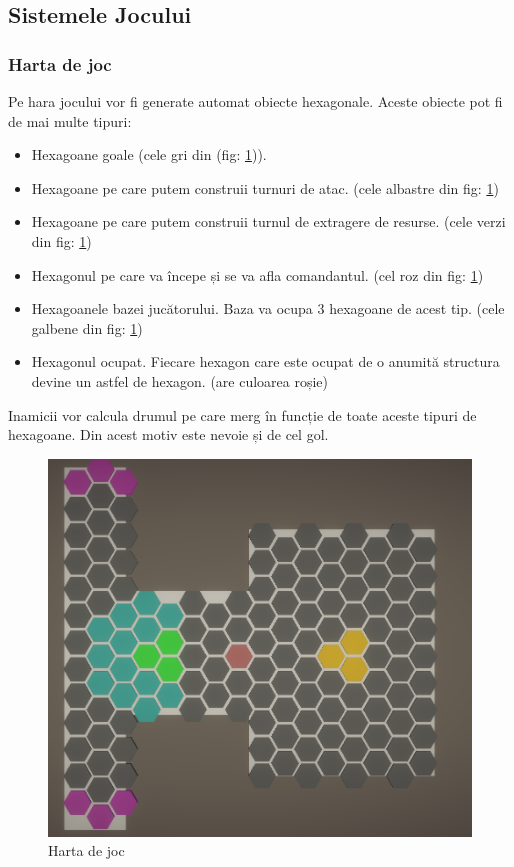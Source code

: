 \documentclass[12pt, a4paper]{article}
\begin{document}
	
	
	
	
	\subsection{Sistemele Jocului}
	
	\subsubsection{Harta de joc}
	
	Pe hara jocului vor fi generate automat obiecte hexagonale. Aceste obiecte pot fi de mai multe tipuri:
	\begin{itemize}
		\item Hexagoane goale (cele gri din (fig: \ref{fig: gridSystem})).
		\item Hexagoane pe care putem construii turnuri de atac. (cele albastre din fig: \ref{fig: gridSystem})
		\item Hexagoane pe care putem construii turnul de extragere de resurse. (cele verzi din fig: \ref{fig: gridSystem})
		\item Hexagonul pe care va începe și se va afla comandantul. (cel roz din fig: \ref{fig: gridSystem})
		\item Hexagoanele bazei jucătorului. Baza va ocupa 3 hexagoane de acest tip. (cele galbene din fig: \ref{fig: gridSystem})
		\item Hexagonul ocupat. Fiecare hexagon care este ocupat de o anumită structura devine un astfel de hexagon. (are culoarea roșie)
	\end{itemize}
	
	Inamicii vor calcula drumul pe care merg în funcție de toate aceste tipuri de hexagoane. Din acest motiv este nevoie și de cel gol.
	
	\begin{figure}[H]
		\centering
		\includegraphics[width=1\textwidth]{Map.png}
		\caption{Harta de joc}
		\label{fig: gridSystem}
	\end{figure}
\end{document}
